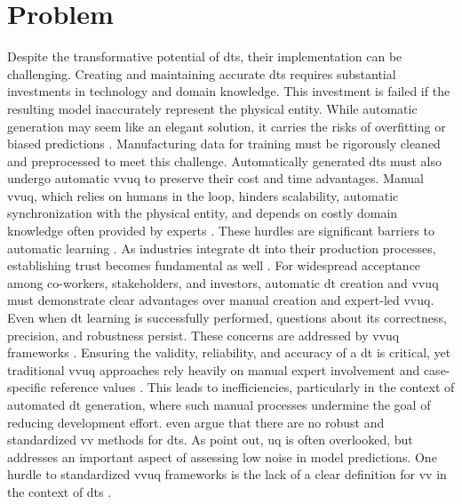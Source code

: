 \section{Problem}
\label{sec:problem}
Despite the transformative potential of \gls{dt}s, their implementation can be challenging. Creating and maintaining accurate \gls{dt}s requires substantial investments in technology and domain knowledge. This investment is failed if the resulting model inaccurately represent the physical entity. While automatic generation may seem like an elegant solution, it carries the risks of overfitting or biased predictions \autocite{gemanbias}. Manufacturing data for training must be rigorously cleaned and preprocessed to meet this challenge. Automatically generated \gls{dt}s must also undergo automatic \gls{vvuq} to preserve their cost and time advantages. Manual \gls{vvuq}, which relies on humans in the loop, hinders scalability, automatic synchronization with the physical entity, and depends on costly domain knowledge often provided by experts \autocite{Bitencourt2023}. These hurdles are significant barriers to automatic learning \autocite{ribeiro2016should,zhao2024data}. As industries integrate \gls{dt} into their production processes, establishing trust becomes fundamental as well \autocite{trauer2022digital,arrieta2020explainable}. For widespread acceptance among co-workers, stakeholders, and investors, automatic \gls{dt} creation and \gls{vvuq} must demonstrate clear advantages over manual creation and expert-led \gls{vvuq}. Even when \gls{dt} learning is successfully performed, questions about its correctness, precision, and robustness persist. These concerns are addressed by \gls{vvuq} frameworks \autocite{sel2025survey}. Ensuring the validity, reliability, and accuracy of a \gls{dt} is critical, yet traditional \gls{vvuq} approaches rely heavily on manual expert involvement and case-specific reference values \autocite{Bitencourt2023,hua2022validation}. This leads to inefficiencies, particularly in the context of automated \gls{dt} generation, where such manual processes undermine the goal of reducing development effort. \textcite{hua2022validation} even argue that there are no robust and standardized \gls{vv} methods for \gls{dt}s. As \textcite{sel2025survey} point out, \gls{uq} is often overlooked, but addresses an important aspect of assessing low noise in model predictions. One hurdle to standardized \gls{vvuq} frameworks is the lack of a clear definition for \gls{vv} in the context of \gls{dt}s \autocite{Bitencourt2023}.

